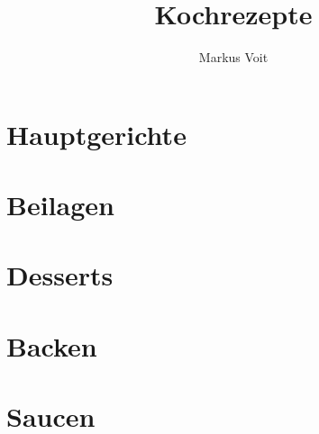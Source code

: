 \documentclass[DIV=11, pagesize, fontsize=11pt, paper=a4, numbers=noenddot]{scrartcl}
\title{Kochrezepte}
\author{Markus Voit}
\begin{document}
\maketitle

\tableofcontents
\clearpage

\section{Hauptgerichte}
\newpage{}
\newpage{}
\newpage{}
\newpage{}
\newpage{}
\newpage{}
\newpage{}
\newpage{}
\newpage{}
\newpage{}

\section{Beilagen}
\newpage{}
\newpage{}
\newpage{}

\section{Desserts}
\newpage{}
\newpage{}
\newpage{}
\newpage{}
\newpage{}

\section{Backen}
\newpage{}
\newpage{}
\newpage{}

\section{Saucen}
\newpage{}
\newpage{}
\newpage{}
\newpage{}
\newpage{}
\newpage{}
\newpage{}
\newpage{}
\newpage{}
\newpage{}
\end{document}
